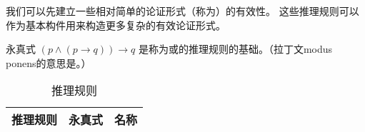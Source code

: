 {{        我们可以先建立一些相对简单的论证形式（称为）的有效性。
        这些推理规则可以作为基本构件用来构造更多复杂的有效论证形式。

        永真式 $(p \wedge (p \rightarrow q)) \rightarrow q$ 是称为或的推理规则的基础。（拉丁文modus ponens的意思是。）

        \begin{table}[htb]
            \centering

            \begin{tabular}{c|c|c}
                \hline
                推理规则 & 永真式 & 名称 \\
                \hline
            \end{tabular}

            \caption{推理规则}
        \end{table}
    }
}
